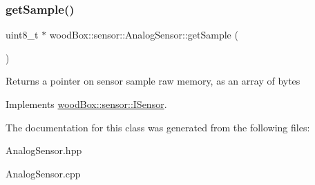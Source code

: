 \subsubsection{\texorpdfstring{get\+Sample()}{getSample()}}
{\footnotesize\ttfamily uint8\+\_\+t $\ast$ wood\+Box\+::sensor\+::\+Analog\+Sensor\+::get\+Sample (\begin{DoxyParamCaption}{ }\end{DoxyParamCaption})\hspace{0.3cm}{\ttfamily [virtual]}}

Returns a pointer on sensor sample raw memory, as an array of bytes 

Implements \mbox{\hyperlink{classwood_box_1_1sensor_1_1_i_sensor_a9de8041b991b76cc2f6fcc3b6a1bf363}{wood\+Box\+::sensor\+::\+I\+Sensor}}.



The documentation for this class was generated from the following files\+:\begin{DoxyCompactItemize}
\item 
Analog\+Sensor.\+hpp\item 
Analog\+Sensor.\+cpp\end{DoxyCompactItemize}
